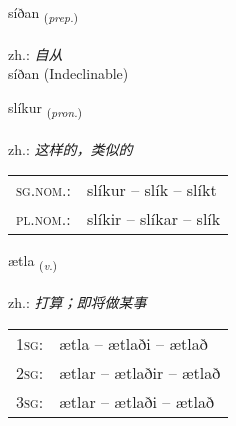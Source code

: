 \documentclass[frontgrid, backgrid]{flacards}\usepackage[]{graphicx}\usepackage[]{xcolor}
\begin{document}
{síðan \small{\textsubscript{(\textit{prep.})}} \\[1ex]
\textphonetic{[siːðan]} \\
zh.: \emph{自从} \\  [2ex]
síðan (Indeclinable)}

\renewcommand{\flhead}{\vskip5pt \fboxsep=0pt {\small\bfseries\footnotesize Fornafn | 代词}}
\renewcommand{\fcfoot}{\vskip5pt \fboxsep=0pt \hspace{2pt}{\small\bfseries\footnotesize 1K}}

\renewcommand{\blhead}{\vskip5pt {\small\bfseries\footnotesize Fornafn | 代词 }}
\renewcommand{\bcfoot}{\vskip5pt \hspace{2pt}{\small\bfseries\footnotesize 1K}}


{slíkur \small{\textsubscript{(\textit{pron.})}} \\[1ex] %
\textphonetic{[stliːkʏr]} \\
zh.: \emph{这样的，类似的} \\  [2ex]
\renewcommand*{\arraystretch}{0.8}
\begin{tabular}{ll}
\textsc{sg.nom.}: & slíkur  --  slík -- slíkt \\ 
\textsc{pl.nom.}: & slíkir -- slíkar -- slík
\end{tabular}
}

\renewcommand{\flhead}{\vskip5pt \fboxsep=0pt {\small\bfseries\footnotesize Sagnorð | 动词}}
\renewcommand{\fcfoot}{\vskip5pt \fboxsep=0pt \hspace{2pt}{\small\bfseries\footnotesize 1K}}

\renewcommand{\blhead}{\vskip5pt {\small\bfseries\footnotesize Sagnorð | 动词 }}
\renewcommand{\bcfoot}{\vskip5pt \hspace{2pt}{\small\bfseries\footnotesize 1K}}


{ætla \small{\textsubscript{(\textit{v.})}} \\[1ex] %
\textphonetic{[aihtla]} \\
zh.: \emph{打算；即将做某事} \\  [2ex]
\renewcommand*{\arraystretch}{0.8}
\begin{tabular}{p{1cm}l}
\textsc{1sg}: & ætla -- ætlaði -- ætlað \\ 
\textsc{2sg}: & ætlar -- ætlaðir -- ætlað \\ 
\textsc{3sg}: & ætlar -- ætlaði -- ætlað \\ 
\end{tabular}
}
\end{document}
